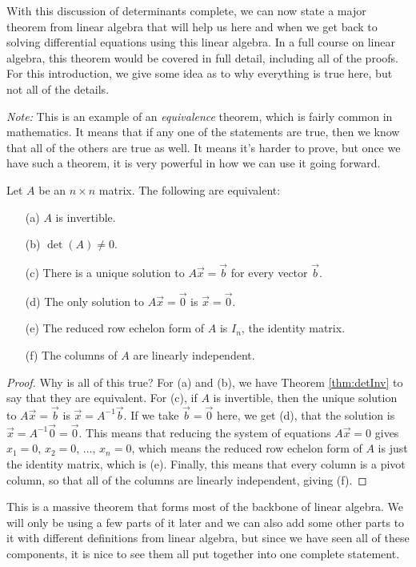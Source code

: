 \documentclass{ximera}
\begin{document}
With this discussion of determinants complete, we can now state a major theorem from linear algebra that will help us here and when we get back to solving differential equations using this linear algebra. In a full course on linear algebra, this theorem would be covered in full detail, including all of the proofs. For this introduction, we give some idea as to why everything is true here, but not all of the details.

\emph{Note:} This is an example of an \emph{equivalence} theorem, which is fairly common in mathematics. It means that if any one of the statements are true, then we know that all of the others are true as well. It means it's harder to prove, but once we have such a theorem, it is very powerful in how we can use it going forward.

\begin{theorem}{}
    \label{thm:bigLinAlg}
    Let $A$ be an $n \times n$ matrix. The following are equivalent:
    \begin{enumerate}
        \item[(a)] $A$ is invertible.
        \item[(b)] $\det(A) \neq 0$.
        \item[(c)] There is a unique solution to $A\vec{x} = \vec{b}$ for every vector $\vec{b}$.
        \item[(d)] The only solution to $A\vec{x} = \vec{0}$ is $\vec{x} = \vec{0}$.
        \item[(e)] The reduced row echelon form of $A$ is $I_n$, the identity matrix.
        \item[(f)] The columns of $A$ are linearly independent.
    \end{enumerate}
\end{theorem}

\begin{proof}
    Why is all of this true? For (a) and (b), we have Theorem \ref{thm:detInv} to say that they are equivalent. For (c), if $A$ is invertible, then the unique solution to $A\vec{x} = \vec{b}$ is $\vec{x} = A^{-1}\vec{b}$. If we take $\vec{b} = \vec{0}$ here, we get (d), that the solution is $\vec{x} = A^{-1}\vec{0} = \vec{0}$. This means that reducing the system of equations $A\vec{x} = 0$ gives $x_1 = 0$, $x_2 = 0$, ..., $x_n = 0$, which means the reduced row echelon form of $A$ is just the identity matrix, which is (e). Finally, this means that every column is a pivot column, so that all of the columns are linearly independent, giving (f).
\end{proof}

This is a massive theorem that forms most of the backbone of linear algebra. We will only be using a few parts of it later and we can also add some other parts to it with different definitions from linear algebra, but since we have seen all of these components, it is nice to see them all put together into one complete statement.
\end{document}
